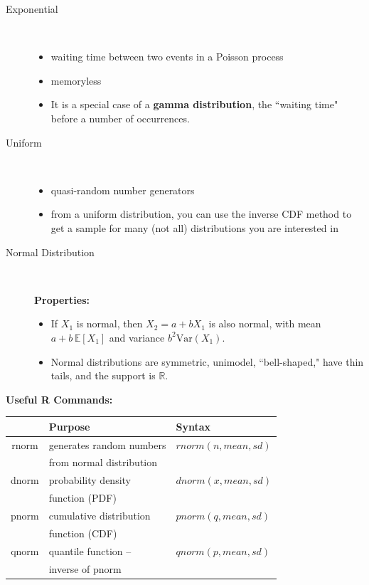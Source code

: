 \documentclass[a4paper,10pt,landscape]{article}
\newcommand{\var}{\textrm{Var}}
\begin{document}
\begin{multicols*}{3}
\begin{description}
	\item[Exponential] ~
	\begin{itemize}[noitemsep,topsep=0pt]
		\item waiting time between two events in a Poisson process
		\item memoryless
		\item It is a special case of a {\bf gamma distribution}, the ``waiting time" before a number of occurrences.
	\end{itemize}
	\item[Uniform] ~
	\begin{itemize}[noitemsep, topsep=0pt]
		\item quasi-random number generators
		\item from a uniform distribution, you can use the inverse CDF method to get a sample for many (not all) distributions you are interested in
	\end{itemize}
	\item[Normal Distribution] ~
	
	{\bf Properties:}
	\begin{itemize}
		\item If $X_1$ is normal, then $X_2=a+bX_1$ is also normal, with mean $a+b\,\mathbb{E}[X_1]$ and variance $b^2\var(X_1)$.
		\item Normal distributions are symmetric, unimodel, ``bell-shaped," have thin tails, and the support is $\mathbb{R}$.
	\end{itemize}
\end{description}

{\bf Useful R Commands:}
\medskip

\begin{minipage}[h]{\columnwidth}
	\centering
	\begin{tabular}{cll}
		\toprule[\heavyrulewidth]\toprule[\heavyrulewidth]
		& \textbf{\centering Purpose} & \textbf{Syntax}\\
		\midrule
		rnorm & generates random numbers &  $rnorm(n,mean,sd)$\\
		& from normal distribution & \\
		dnorm & probability density & $dnorm(x, mean, sd)$\\
		& function (PDF) & \\
		pnorm & cumulative distribution & $pnorm(q, mean, sd)$\\
		& function (CDF) & \\
		qnorm & quantile function -- & $qnorm(p, mean, sd)$ \\
		& inverse of pnorm & \\
		\bottomrule[\heavyrulewidth]\bottomrule[\heavyrulewidth]
	\end{tabular}
\end{minipage}
\medskip


\end{multicols*}
\end{document}
